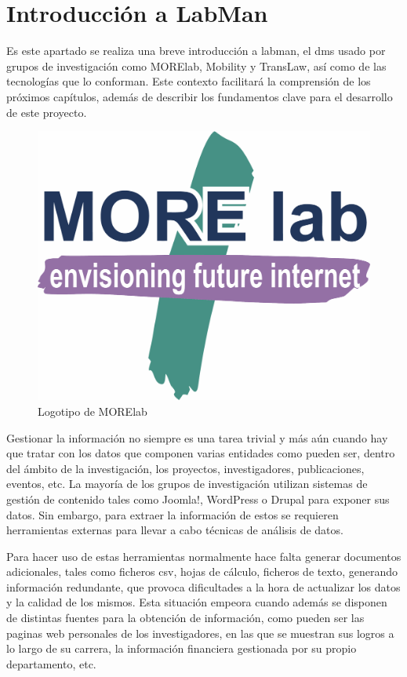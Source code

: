 \section{Introducción a LabMan}

Es este apartado se realiza una breve introducción a \acrfull{labman}, el \acrshort{dms} usado por grupos de investigación como MORElab, Mobility y TransLaw, así como de las tecnologías que lo conforman. Este contexto facilitará la comprensión de los próximos capítulos, además de describir los fundamentos clave para el desarrollo de este proyecto.

\begin{figure}[!htp]
	\centering
	\includegraphics[scale=0.15]{fig/MORElab-logo}
	\caption{Logotipo de MORElab}
\end{figure}

Gestionar la información no siempre es una tarea trivial y más aún cuando hay que tratar con los datos que componen varias entidades como pueden ser, dentro del ámbito de la investigación, los proyectos, investigadores, publicaciones, eventos, etc. La mayoría de los grupos de investigación utilizan sistemas de gestión de contenido tales como Joomla!\cite{joomla}, WordPress\cite{wordpress} o Drupal\cite{drupal} para exponer sus datos. Sin embargo, para extraer la información de estos  se requieren herramientas externas para llevar a cabo técnicas de análisis de datos. 

Para hacer uso de estas herramientas normalmente hace falta generar documentos adicionales, tales como ficheros \acrfull{csv}, hojas de cálculo, ficheros de texto, generando información redundante, que provoca dificultades a la hora de actualizar los datos y la calidad de los mismos. Esta situación empeora cuando además se disponen de distintas fuentes para la obtención de información, como pueden ser las paginas web personales de los investigadores, en las que se muestran sus logros a lo largo de su carrera, la información financiera gestionada por su propio departamento, etc.

